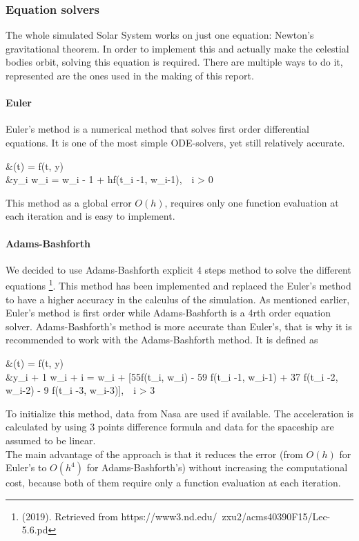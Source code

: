 \documentclass[10pt,a4paper]{article}
\begin{document}
	
	\subsubsection{Equation solvers}
	The whole simulated Solar System works on just one equation: Newton's gravitational theorem. In order to implement this and actually make the celestial bodies orbit, solving this equation is required. There are multiple ways to do it, represented are the ones used in the making of this report.
	
	\paragraph{Euler}
	Euler's method is a numerical method that solves first order differential equations. It is one of the most simple ODE-solvers, yet still relatively accurate.
	\begin{flalign}
	&(t) = f(t, y)\\
	&y_i \approx w_i = w_{i - 1} + hf(t_{i -1}, w_{i-1}),\ \ i > 0
	\end{flalign}
	This method as a global error $O(h)$, requires only one function evaluation at each iteration and is easy to implement.
	
	\paragraph{Adams-Bashforth}
	We decided to use Adams-Bashforth explicit 4 steps method to solve the different equations \footnote{(2019). Retrieved from https://www3.nd.edu/~zxu2/acms40390F15/Lec-5.6.pd}.
	This method has been implemented and replaced the Euler's method to have a higher accuracy in the calculus of the simulation. As mentioned earlier, Euler's method is first order while Adams-Bashforth is a 4rth order equation solver. Adams-Bashforth's method is more accurate than Euler's, that is why it is recommended to work with the Adams-Bashforth method.
	It is defined as
	\begin{flalign}
	&(t) = f(t, y)\\
	&y_{i + 1} \approx w_{i + i} = w_i +  [55f(t_{i}, w_{i}) - 59 f(t_{i -1}, w_{i-1}) + 37 f(t_{i -2}, w_{i-2}) - 9 f(t_{i -3}, w_{i-3})],\ \ i > 3
	\end{flalign}
	To initialize this method, data from Nasa are used if available. The acceleration is calculated by using 3 points difference formula and data for the spaceship are assumed to be linear.\\
	The main advantage of the approach is that it reduces the error (from $O(h)$ for Euler's to $O(h^4)$ for Adams-Bashforth's) without increasing the computational cost, because both of them require only a function evaluation at each iteration.    
	
\end{document}
